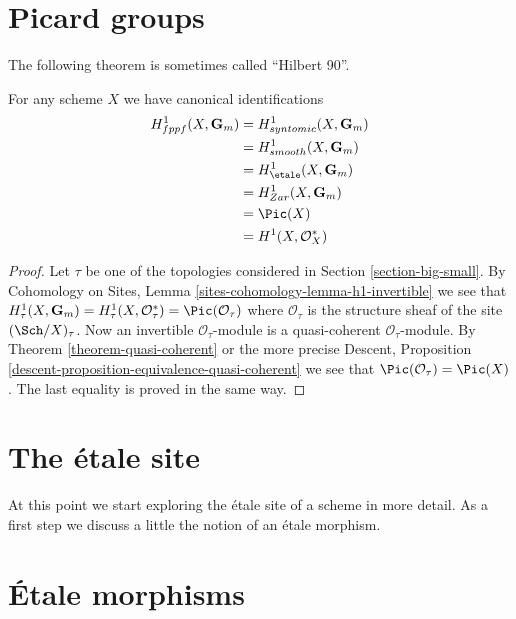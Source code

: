 \section{Picard groups}
\label{section-picard-groups}

\noindent
The following theorem is sometimes called ``Hilbert 90''.

\begin{theorem}
\label{theorem-picard-group}
For any scheme $X$ we have canonical identifications
\begin{align*}
H_{fppf}^1(X, \mathbf{G}_m) & = H^1_{syntomic}(X, \mathbf{G}_m) \\
& = H^1_{smooth}(X, \mathbf{G}_m) \\
& = H_\etale^1(X, \mathbf{G}_m) \\
& = H^1_{Zar}(X, \mathbf{G}_m) \\
& = \Pic(X) \\
& = H^1(X, \mathcal{O}_X^*)
\end{align*}
\end{theorem}

\begin{proof}
Let $\tau$ be one of the topologies considered in
Section \ref{section-big-small}.
By
Cohomology on Sites, Lemma
\ref{sites-cohomology-lemma-h1-invertible}
we see that
$H^1_\tau(X, \mathbf{G}_m) =
H^1_\tau(X, \mathcal{O}_\tau^*) =
\Pic(\mathcal{O}_\tau)$
where $\mathcal{O}_\tau$ is the structure sheaf of the site
$(\Sch/X)_\tau$. Now an invertible $\mathcal{O}_\tau$-module
is a quasi-coherent $\mathcal{O}_\tau$-module.
By Theorem \ref{theorem-quasi-coherent} or the more precise
Descent, Proposition \ref{descent-proposition-equivalence-quasi-coherent}
we see that $\Pic(\mathcal{O}_\tau) = \Pic(X)$.
The last equality is proved in the same way.
\end{proof}






\section{The \'etale site}
\label{section-etale-site}

\noindent
At this point we start exploring the \'etale site of a scheme in
more detail. As a first step we discuss a little the notion of an
\'etale morphism.





\section{\'Etale morphisms}
\label{section-etale-morphism}

